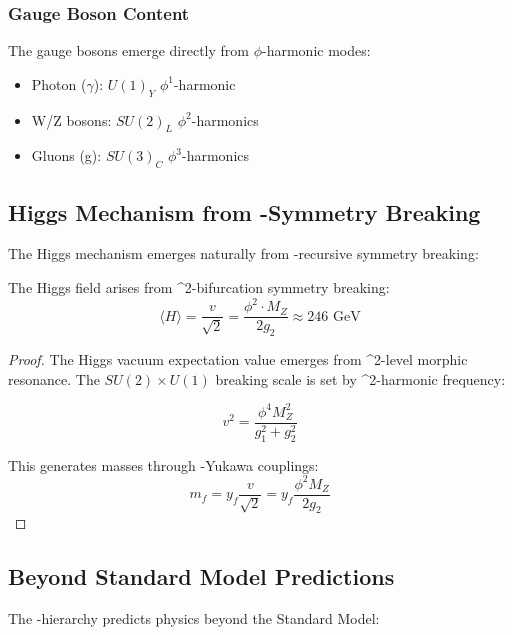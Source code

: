 \subsubsection{Gauge Boson Content}

The gauge bosons emerge directly from $\phi$-harmonic modes:
\begin{itemize}
\item Photon ($\gamma$): $U(1)_Y$ $\phi^1$-harmonic
\item W/Z bosons: $SU(2)_L$ $\phi^2$-harmonics
\item Gluons (g): $SU(3)_C$ $\phi^3$-harmonics
\end{itemize}

\subsection{Higgs Mechanism from \phi-Symmetry Breaking}

The Higgs mechanism emerges naturally from \phi-recursive symmetry breaking:

\begin{theorem}
The Higgs field arises from \phi^2-bifurcation symmetry breaking:
\begin{equation}
\langle H \rangle = \frac{v}{\sqrt{2}} = \frac{\phi^2 \cdot M_Z}{2g_2} \approx 246 \text{ GeV}
\label{eq:phi_higgs_vev}
\end{equation}
\end{theorem}

\begin{proof}
The Higgs vacuum expectation value emerges from \phi^2-level morphic resonance. The $SU(2) \times U(1)$ breaking scale is set by \phi^2-harmonic frequency:

\begin{equation}
v^2 = \frac{\phi^4 M_Z^2}{g_1^2 + g_2^2}
\end{equation}

This generates masses through \phi-Yukawa couplings:
\begin{equation}
m_f = y_f \frac{v}{\sqrt{2}} = y_f \frac{\phi^2 M_Z}{2g_2}
\end{equation}
\end{proof}

\subsection{Beyond Standard Model Predictions}

The \phi-hierarchy predicts physics beyond the Standard Model:


